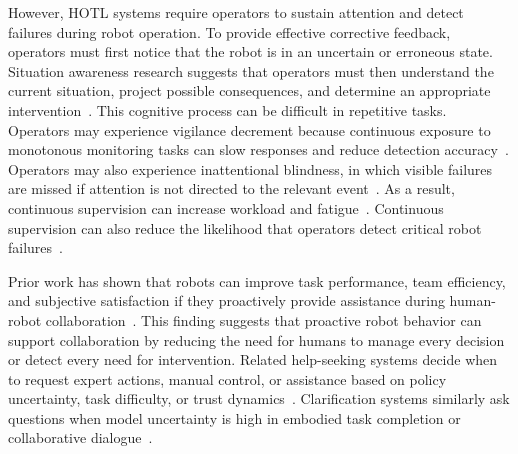 However, HOTL systems require operators to sustain attention and detect failures during robot operation. To provide effective corrective feedback, operators must first notice that the robot is in an uncertain or erroneous state. Situation awareness research suggests that operators must then understand the current situation, project possible consequences, and determine an appropriate intervention~\cite{endsley2018automation}. This cognitive process can be difficult in repetitive tasks. Operators may experience vigilance decrement because continuous exposure to monotonous monitoring tasks can slow responses and reduce detection accuracy~\cite{davies1982psychology, davies2013human}. Operators may also experience inattentional blindness, in which visible failures are missed if attention is not directed to the relevant event~\cite{mack2003inattentional}. As a result, continuous supervision can increase workload and fatigue~\cite{wong2017workload}. Continuous supervision can also reduce the likelihood that operators detect critical robot failures~\cite{wong2017workload, galster2006managing}.


Prior work has shown that robots can improve task performance, team efficiency, and subjective satisfaction if they proactively provide assistance during human-robot collaboration~\cite{baraglia2017efficient}. This finding suggests that proactive robot behavior can support collaboration by reducing the need for humans to manage every decision or detect every need for intervention. Related help-seeking systems decide when to request expert actions, manual control, or assistance based on policy uncertainty, task difficulty, or trust dynamics~\cite{singi2023hula,igbinedion2024learning,zhao2025conformalized,mangalindan2025seek}. Clarification systems similarly ask questions when model uncertainty is high in embodied task completion or collaborative dialogue~\cite{shen2024elba,testoni2024asking}.



